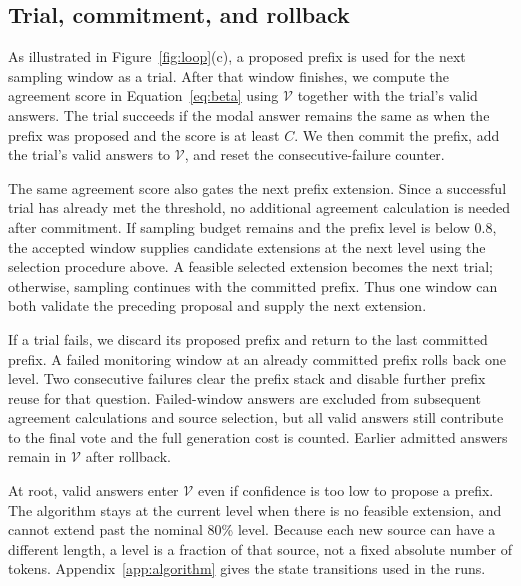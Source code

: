 \subsection{Trial, commitment, and rollback}
As illustrated in Figure~\ref{fig:loop}(c), a proposed prefix is used for the next sampling window as a trial. After that window finishes, we compute the agreement score in Equation~\ref{eq:beta} using $\mathcal V$ together with the trial's valid answers. The trial succeeds if the modal answer remains the same as when the prefix was proposed and the score is at least $C$. We then commit the prefix, add the trial's valid answers to $\mathcal V$, and reset the consecutive-failure counter.

The same agreement score also gates the next prefix extension. Since a successful trial has already met the threshold, no additional agreement calculation is needed after commitment. If sampling budget remains and the prefix level is below 0.8, the accepted window supplies candidate extensions at the next level using the selection procedure above. A feasible selected extension becomes the next trial; otherwise, sampling continues with the committed prefix. Thus one window can both validate the preceding proposal and supply the next extension.

If a trial fails, we discard its proposed prefix and return to the last committed prefix. A failed monitoring window at an already committed prefix rolls back one level. Two consecutive failures clear the prefix stack and disable further prefix reuse for that question. Failed-window answers are excluded from subsequent agreement calculations and source selection, but all valid answers still contribute to the final vote and the full generation cost is counted. Earlier admitted answers remain in $\mathcal V$ after rollback.

At root, valid answers enter $\mathcal V$ even if confidence is too low to propose a prefix. The algorithm stays at the current level when there is no feasible extension, and cannot extend past the nominal 80\% level. Because each new source can have a different length, a level is a fraction of that source, not a fixed absolute number of tokens. Appendix~\ref{app:algorithm} gives the state transitions used in the runs.
